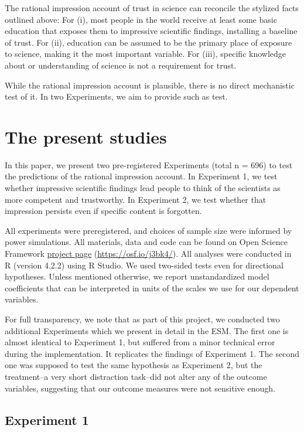 \documentclass[
  doc,floatsintext]{apa6}
\begin{document}
The rational impression account of trust in science can reconcile the stylized facts outlined above: For (i), most people in the world receive at least some basic education that exposes them to impressive scientific findings, installing a baseline of trust. For (ii), education can be assumed to be the primary place of exposure to science, making it the most important variable. For (iii), specific knowledge about or understanding of science is not a requirement for trust.

While the rational impression account is plausible, there is no direct mechanistic test of it. In two Experiments, we aim to provide such as test.

\section{The present studies}\label{the-present-studies}

In this paper, we present two pre-registered Experiments (total n = 696) to test the predictions of the rational impression account. In Experiment 1, we test whether impressive scientific findings lead people to think of the scientists as more competent and trustworthy. In Experiment 2, we test whether that impression persists even if specific content is forgotten.

All experiments were preregistered, and choices of sample size were informed by power simulations. All materials, data and code can be found on Open Science Framework \href{https://osf.io/j3bk4/}{project page} (\url{https://osf.io/j3bk4/}). All analyses were conducted in R (version 4.2.2) using R Studio. We used two-sided tests even for directional hypotheses. Unless mentioned otherwise, we report unstandardized model coefficients that can be interpreted in units of the scales we use for our dependent variables.

For full transparency, we note that as part of this project, we conducted two additional Experiments which we present in detail in the ESM. The first one is almost identical to Experiment 1, but suffered from a minor technical error during the implementation. It replicates the findings of Experiment 1. The second one was supposed to test the same hypothesis as Experiment 2, but the treatment--a very short distraction task--did not alter any of the outcome variables, suggesting that our outcome measures were not sensitive enough.

\subsection{Experiment 1}\label{experiment-1}
\end{document}
